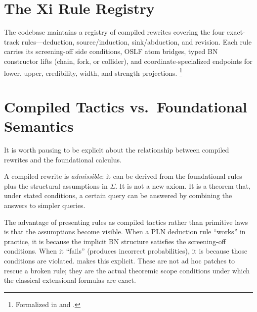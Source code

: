 \documentclass[11pt,openany]{report}
\begin{document}

\section{The Xi Rule Registry}

The codebase maintains a registry of compiled rewrites covering the four
exact-track rules---deduction, source/induction, sink/abduction, and
revision.  Each rule carries its screening-off side conditions, OSLF atom
bridges, typed BN constructor lifts (chain, fork, or collider), and
coordinate-specialized endpoints for lower, upper, credibility, width,
and strength projections.%
\footnote{Formalized in  and
  .}

\section{Compiled Tactics vs.\ Foundational Semantics}

It is worth pausing to be explicit about the relationship between compiled
rewrites and the foundational calculus.

A compiled rewrite is \emph{admissible}: it can be derived from the
foundational rules plus the structural assumptions in $\Sigma$.  It is
not a new axiom.  It is a theorem that, under stated conditions, a certain
query can be answered by combining the answers to simpler queries.

The advantage of presenting rules as compiled tactics rather than primitive
laws is that the assumptions become visible.  When a PLN deduction rule
``works'' in practice, it is because the implicit BN structure satisfies
the screening-off conditions.  When it ``fails'' (produces incorrect
probabilities), it is because those conditions are violated.  \xiPLN{}
makes this explicit.  These are not ad hoc patches to rescue a broken
rule; they are the actual theoremic scope conditions under which the
classical extensional formulas are exact.
\end{document}
